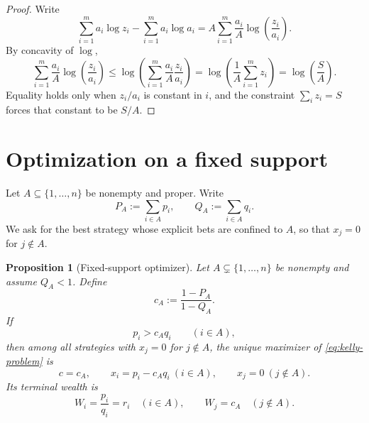 \documentclass[11pt]{article}
\newtheorem{proposition}[theorem]{Proposition}
\begin{document}
\begin{proof}
Write
\[
  \sum_{i=1}^m a_i\log z_i-\sum_{i=1}^m a_i\log a_i
  =A\sum_{i=1}^m \frac{a_i}{A}\log\!\left(\frac{z_i}{a_i}\right).
\]
By concavity of $\log$,
\[
  \sum_{i=1}^m \frac{a_i}{A}\log\!\left(\frac{z_i}{a_i}\right)
  \le \log\!\left(\sum_{i=1}^m \frac{a_i}{A}\frac{z_i}{a_i}\right)
  =\log\!\left(\frac{1}{A}\sum_{i=1}^m z_i\right)
  =\log\!\left(\frac{S}{A}\right).
\]
Equality holds only when $z_i/a_i$ is constant in $i$, and the constraint $\sum_i z_i=S$ forces that constant to be $S/A$.
\end{proof}

\section{Optimization on a fixed support}
Let $A\subseteq\{1,\dots,n\}$ be nonempty and proper. Write
\[
  P_A:=\sum_{i\in A} p_i, \qquad Q_A:=\sum_{i\in A} q_i.
\]
We ask for the best strategy whose explicit bets are confined to $A$, so that $x_j=0$ for $j\notin A$.

\begin{proposition}[Fixed-support optimizer]\label{prop:fixed-support}
Let $A\subsetneq\{1,\dots,n\}$ be nonempty and assume $Q_A<1$. Define
\begin{equation}\label{eq:cash-A}
  c_A:=\frac{1-P_A}{1-Q_A}.
\end{equation}
If
\begin{equation}\label{eq:positivity-A}
  p_i>c_A q_i \qquad (i\in A),
\end{equation}
then among all strategies with $x_j=0$ for $j\notin A$, the unique maximizer of \eqref{eq:kelly-problem} is
\begin{equation}\label{eq:fixed-support-solution}
  c=c_A,\qquad x_i=p_i-c_Aq_i \ (i\in A),\qquad x_j=0 \ (j\notin A).
\end{equation}
Its terminal wealth is
\begin{equation}\label{eq:wealth-levels-fixed-support}
  W_i=\frac{p_i}{q_i}=r_i \quad (i\in A),
  \qquad
  W_j=c_A \quad (j\notin A).
\end{equation}
\end{proposition}
\end{document}
